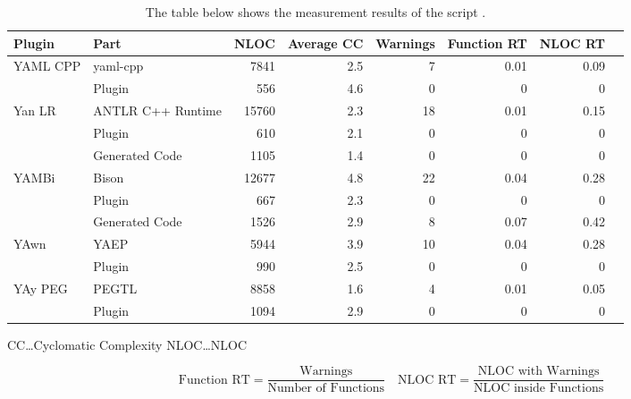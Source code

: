 \begin{table}[H]
  \begin{adjustbox}{max width=\textwidth}
  \begin{threeparttable}
  \caption{The table below shows the measurement results of the script \FileCheckComplexity{}.}
  \label{table:cyclomatic_complexity}
  \centering
  \begin{tabular}{llrrrrrr}
\toprule
     Plugin &                    Part &  NLOC & Average CC & Warnings & Function RT & NLOC RT\\
\midrule
   YAML CPP &                yaml-cpp &  7841 &        2.5 &        7 &        0.01 &    0.09\\
            &                  Plugin &   556 &        4.6 &        0 &           0 &       0\\
\midrule
     Yan LR & \gls{ANTLR} C++ Runtime & 15760 &        2.3 &       18 &        0.01 &    0.15\\
            &                  Plugin &   610 &        2.1 &        0 &           0 &       0\\
            &          Generated Code &  1105 &        1.4 &        0 &           0 &       0\\
\midrule
      YAMBi &                   Bison & 12677 &        4.8 &       22 &        0.04 &    0.28\\
            &                  Plugin &   667 &        2.3 &        0 &           0 &       0\\
            &          Generated Code &  1526 &        2.9 &        8 &        0.07 &    0.42\\
\midrule
       YAwn &                    YAEP &  5944 &        3.9 &       10 &        0.04 &    0.28\\
            &                  Plugin &   990 &        2.5 &        0 &           0 &       0\\
\midrule
    YAy PEG &                   PEGTL &  8858 &        1.6 &        4 &        0.01 &    0.05\\
            &                  Plugin &  1094 &        2.9 &        0 &           0 &       0\\
\bottomrule
  \end{tabular}

  \vspace{0.2cm}
  \begin{tablenotes}
    \item
        \hspace{1.65cm}
        CC…Cyclomatic Complexity
        \hspace{1.7cm}
        NLOC…\glsdesc{NLOC}
    \item
      \[
       \text{Function RT} = \frac{\text{Warnings}}{\text{Number of Functions}}\quad
       \text{NLOC RT} = \frac{\text{NLOC with Warnings}}{\text{NLOC inside Functions}}
      \]
  \end{tablenotes}

  \end{threeparttable}
  \end{adjustbox}
\end{table}

